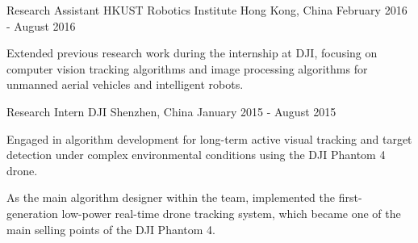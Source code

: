 \begin{cventries}
\cventry
{Research Assistant} %
{HKUST Robotics Institute} %
{Hong Kong, China} %
{February 2016 - August 2016} %
{
	\begin{cvitems} %
		\item {Extended previous research work during the internship at DJI, focusing on computer vision tracking algorithms and image processing algorithms for unmanned aerial vehicles and intelligent robots.}
	\end{cvitems}
}

\cventry
{Research Intern} %
{DJI} %
{Shenzhen, China} %
{January 2015 - August 2015} %
{
	\begin{cvitems} %
		\item {Engaged in algorithm development for long-term active visual tracking and target detection under complex environmental conditions using the DJI Phantom 4 drone.}
		\item {As the main algorithm designer within the team, implemented the first-generation low-power real-time drone tracking system, which became one of the main selling points of the DJI Phantom 4.}
	\end{cvitems}
}

\end{cventries}
